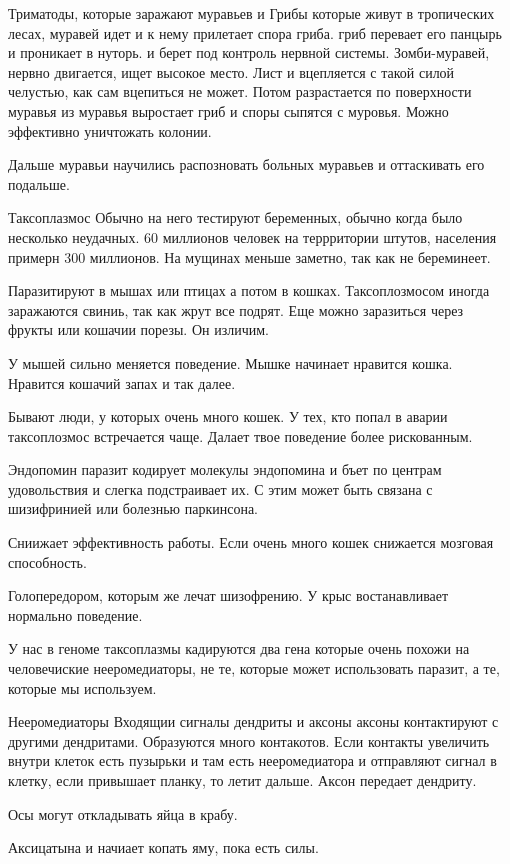 Триматоды, которые заражают муравьев и 
Грибы которые живут в тропических лесах,
муравей идет и к нему прилетает спора гриба. 
гриб перевает его панцырь и проникает в нуторь. 
и берет под контроль нервной системы. Зомби-муравей, 
нервно двигается, ищет высокое место. Лист и вцепляется с
такой силой челустью, как сам вцепиться не может. Потом
разрастается по поверхности муравья из муравья выростает гриб 
и споры сыпятся с муровья. Можно эффективно уничтожать колонии. 

Дальше муравьи научились распозновать больных муравьев и оттаскивать его подальше. 

Таксоплазмос
Обычно на него тестируют беременных, обычно 
когда было несколько неудачных. 
60 миллионов человек на террритории штутов, населения примерн 300 миллионов. 
На мущинах меньше заметно, так как не береминеет. 

Паразитируют в мышах или птицах а потом в кошках. 
Таксоплозмосом иногда заражаются свиниь, так 
как жрут все подрят. Еще можно заразиться 
через фрукты или кошачии порезы. Он изличим. 

У мышей сильно меняется поведение. Мышке начинает 
нравится кошка. Нравится кошачий запах и так далее. 

Бывают люди, у которых очень много кошек. У тех, 
кто попал в аварии таксоплозмос встречается чаще.
Далает твое поведение более рискованным. 

Эндопомин паразит кодирует молекулы эндопомина и бъет 
по центрам удовольствия и слегка подстраивает их. 
С этим может быть связана с шизифринией или болезнью 
паркинсона. 
 
Сниижает эффективность работы. Если
очень много кошек снижается мозговая способность.

Голопередором, которым же лечат шизофрению. У
крыс востанавливает нормально поведение.

У нас в геноме таксоплазмы кадируются два гена
которые очень похожи
на человечиские нееромедиаторы, не те,
которые может использовать паразит,
а те, которые мы используем.

Нееромедиаторы 
Входящии сигналы
дендриты и аксоны
аксоны контактируют с другими дендритами.
Образуются много контакотов. Если
контакты увеличить внутри клеток есть
пузырьки и там есть нееромедиатора и
отправляют сигнал в клетку, если привышает планку,
то летит дальше. Аксон передает дендриту.

Осы могут откладывать яйца в крабу. 

Аксицатына и начиает копать яму, пока есть силы.


